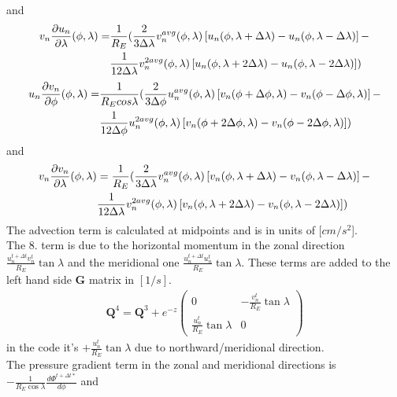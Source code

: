 %
and
%
\begin{align}
  v_n \frac{\partial u_n}{\partial \lambda }(\phi,\lambda) = &
  \frac{1}{R_E} ( \frac{2}{3 \Delta \lambda}v_n^{avg}(\phi,\lambda) \left[
   u_n(\phi,\lambda+\Delta \lambda) - u_n(\phi,\lambda-\Delta \lambda)  \right] - \notag \\
   {} & \frac{1}{12 \Delta \lambda}v_n^{2avg}(\phi,\lambda) \left[
   u_n(\phi,\lambda+2\Delta \lambda) - u_n(\phi,\lambda-2\Delta \lambda)  \right] )
\end{align}
%
%
\begin{align}
  u_n \frac{\partial v_n}{\partial \phi}(\phi,\lambda) = &
  \frac{1}{R_E cos \lambda} (
  \frac{2}{3 \Delta \phi}u_n^{avg}(\phi,\lambda) \left[
   v_n(\phi+\Delta \phi,\lambda) - v_n(\phi-\Delta \phi,\lambda)  \right] - \notag \\
   {} & \frac{1}{12 \Delta \phi}u_n^{2avg}(\phi,\lambda) \left[
   v_n(\phi+2\Delta \phi,\lambda) - v_n(\phi-2\Delta \phi,\lambda)  \right] )
\end{align}
%
and
%
\begin{align}
  v_n \frac{\partial v_n}{\partial \lambda }(\phi,\lambda) & =
  \frac{1}{R_E} ( \frac{2}{3 \Delta \lambda}
  v_n^{avg}(\phi,\lambda) \left[
   v_n(\phi,\lambda+\Delta \lambda) - v_n(\phi,\lambda-\Delta \lambda)  \right] - \notag \\
 {} &   \frac{1}{12 \Delta \lambda}v_n^{2avg}(\phi,\lambda) \left[
   v_n(\phi,\lambda+2\Delta \lambda) - v_n(\phi,\lambda-2\Delta \lambda)  \right] )
\end{align}
%
The advection term is calculated at midpoints and is in units of
[$cm/s^2$]. \\
%
The 8. term is due to the horizontal momentum in the zonal direction
$\frac{u_n^{t+\Delta t} v_n^t}{R_E} \tan \lambda$ and the meridional
one $\frac{u_n^{t+\Delta t} u_n^t}{R_E} \tan \lambda$. These terms
are added to the left hand side $\mathbf{G}$ matrix in $[1/s]$.
%
\begin{gather}
  \mathbf{Q}^4= \mathbf{Q}^3 + e^{-z}
   \begin{pmatrix}
       0 & - \frac{v_n^t}{R_E}\tan \lambda \\
       \frac{u_n^t}{R_E}\tan \lambda & 0
   \end{pmatrix}
\end{gather}
%
in the code it's $+\frac{u_n^t}{R_E}\tan \lambda$  due
to northward/meridional direction.\\
%
The pressure gradient term in the zonal and meridional directions is $-
\frac{1}{R_E \cos \lambda} \frac{d \Phi^{t+\Delta t*}}{d \phi}$ and
